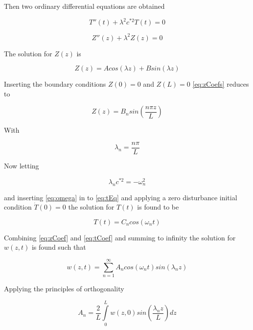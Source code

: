 Then two ordinary differential equations are obtained

\begin{equation}
T''(t) + \lambda^ 2 c^{*2}T(t) = 0
\label{eq:tEq}
\end{equation}

\begin{equation}
Z''(z) + \lambda ^2 Z(z) = 0
\end{equation}

The solution for $Z(z)$ is

\begin{equation}
Z(z) = A cos(\lambda z) + B sin(\lambda z)
\label{eq:zCoefs}
\end{equation}

Inserting the boundary conditions $Z(0) = 0$ and $Z(L) =0$ \ref{eq:zCoefs} reduces to

\begin{equation}
Z(z) = B_n sin\left(\frac{n \pi z}{L} \right)
\label{eq:zCoef}
\end{equation} 

With 

\begin{equation}
\lambda _n = \frac{n \pi}{L}
\end{equation}

Now letting

\begin{equation}
\lambda _n c^{*2}  = -\omega _n ^2
\label{eq:omega}
\end{equation}

and inserting \ref{eq:omega} in to \ref{eq:tEq} and applying a zero disturbance initial condition $\dot{T}(0) = 0$ the solution for $T(t)$ is found to be

\begin{equation}
T(t) = C_n cos(\omega _n t)
\label{eq:tCoef}
\end{equation}

Combining \ref{eq:zCoef} and \ref{eq:tCoef} and summing to infinity the solution for $w(z,t)$ is found such that

\begin{equation}
w(z,t) = \sum\limits_{n=1}^{\infty} A_n cos(\omega _n t) sin( \lambda _n z)
\end{equation}

Applying the principles of orthogonality

\begin{equation}
A_n = \frac{2}{L} \int\limits_{0}^{L} w(z, 0) sin\left( \frac{\lambda _n z}{L} \right) dz
\end{equation}


